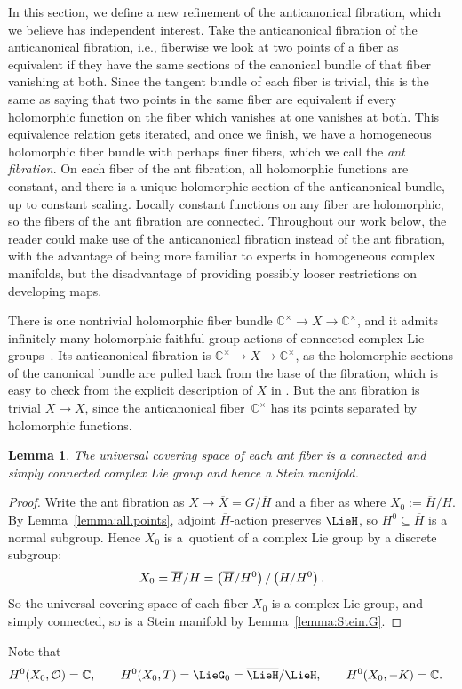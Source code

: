 \documentclass[11pt]{article}
\numberwithin{equation}{section}
\providecommand{\C}{\mathbb{C}}
\numberwithin{equation}{section}
\newtheorem{Lemma}[Theorem]{Lemma}
\renewcommand{\C}{\mathbb{C}}
\newcommand{\OO}{\mathcal{O}}
\newcommand{\GZ}{G_0}
\begin{document}
In this section, we define a new refinement of the anticanonical fibration, which we believe has independent interest.
Take the anticanonical fibration of the anticanonical fibration, i.e., fiberwise we look at two points of a fiber as equivalent if they have the same sections of the canonical bundle of that fiber vanishing at both.
Since the tangent bundle of each fiber is trivial, this is the same as saying that two points in the same fiber are equivalent if every holomorphic function on the fiber which vanishes at one vanishes at both.
This equivalence relation gets iterated, and once we finish, we have a homogeneous holomorphic fiber bundle with perhaps finer fibers, which we call the \emph{ant fibration}.
On each fiber of the ant fibration, all holomorphic functions are constant, and there is a unique holomorphic section of the anticanonical bundle, up to constant scaling.
Locally constant functions on any fiber are holomorphic, so the fibers of the ant fibration are connected.
Throughout our work below, the reader could make use of the anticanonical fibration instead of the ant fibration, with the advantage of being more familiar to experts in homogeneous complex manifolds, but the disadvantage of providing possibly looser restrictions on developing maps.

\begin{Example}
There is one nontrivial holomorphic fiber bundle $\C^{\times} \to X \to \C^{\times}$, and it admits
infinitely many holomorphic faithful group actions of connected complex Lie groups~\cite{McKay:2015}. Its
anticanonical fibration is $\C^{\times} \to X \to \C^{\times}$, as the holomorphic sections of the
canonical bundle are pulled back from the base of the fibration, which is easy to check from the explicit
description of $X$ in \cite{McKay:2015}. But the ant fibration is trivial $X \to X$, since the
anticanonical fiber~$\C^{\times}$ has its points separated by holomorphic functions.
\end{Example}

\begin{Lemma}\label{lemma:ant.Stein}
The universal covering space of each ant fiber is a connected and simply connected complex Lie group and hence a Stein manifold.
\end{Lemma}

\begin{proof}
Write the ant fibration as $X\to \overline{X} = G/\overline{H}$ and a fiber as \pr{X_0,\GZ} where $X_0 := \overline{H}/H$.
By Lemma~\ref{lemma:all.points}, adjoint $\overline{H}$-action preserves $\LieH$, so $H^0 \subseteq \overline{H}$ is a normal subgroup.
Hence $X_0$ is a~quotient of a complex Lie group by a discrete subgroup:
\[
X_0 = \overline{H}/H = \left(\overline{H}/H^0\right)/\left(H/H^0\right).
\]
So the universal covering space of each fiber $X_0$ is a complex Lie group, and simply connected, so is a Stein manifold by Lemma~\ref{lemma:Stein.G}.
\end{proof}
Note that
\begin{align*}
&\cohomology{0}{X_0,\OO}=\C,\qquad
\cohomology{0}{X_0,T}=\LieG_0=\overline{\LieH}/\LieH,\qquad
\cohomology{0}{X_0,\acb{}}=\C.
\end{align*}
\end{document}
